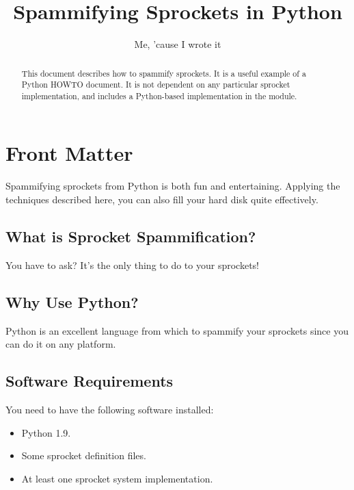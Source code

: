 \documentclass{howto}
\title{Spammifying Sprockets in Python}
\author{Me, 'cause I wrote it}
\begin{document}
\maketitle

%
\ifhtml
\chapter*{Front Matter\label{front}}
\fi


\begin{abstract}
\noindent
This document describes how to spammify sprockets.  It is a useful
example of a Python HOWTO document.  It is not dependent on any
particular sprocket implementation, and includes a Python-based
implementation in the  module.
\end{abstract}

\tableofcontents

Spammifying sprockets from Python is both fun and entertaining.
Applying the techniques described here, you can also fill your hard
disk quite effectively.

\section{What is Sprocket Spammification?}

You have to ask?  It's the only thing to do to your sprockets!


\section{Why Use Python?}

Python is an excellent language from which to spammify your sprockets
since you can do it on any platform.


\section{Software Requirements}

You need to have the following software installed:

\begin{itemize}
  \item  Python 1.9.
  \item  Some sprocket definition files.
  \item  At least one sprocket system implementation.
\end{itemize}
\end{document}

